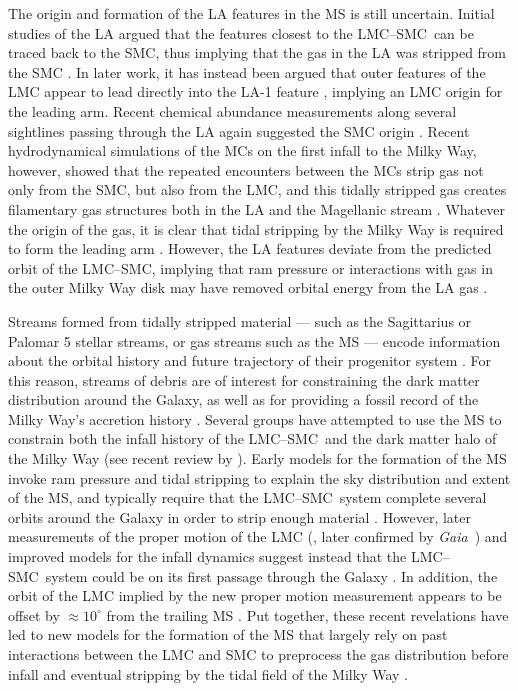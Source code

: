 \documentclass[twocolumn]{aastex62}
\newcommand{\gaia}{\textsl{Gaia}}
\newcommand{\lmcsmc}{LMC--SMC}
\begin{document}
The origin and formation of the LA features in the MS is still uncertain.
Initial studies of the LA argued that the features closest to the \lmcsmc\ can be traced back to the SMC, thus implying that the gas in the LA was stripped from the SMC \citep{Putman:1998}.
In later work, it has instead been argued that outer features of the LMC appear to lead directly into the LA-1 feature \citep{Nidever:2008}, implying an LMC origin for the leading arm.
Recent chemical abundance measurements along several sightlines passing through the LA again suggested the SMC origin \citep{Fox:2018, Richter:2018}.
Recent hydrodynamical simulations of the MCs on the first infall to the Milky Way, however, showed that the repeated encounters between the MCs strip gas not only from the SMC, but also from the LMC, and this tidally stripped gas creates filamentary gas structures both in the LA and the Magellanic stream \citep{Pardy:2018}.
Whatever the origin of the gas, it is clear that tidal stripping by the Milky Way is required to form the leading arm \citep{Nidever:2008, Besla:2012}.
However, the LA features deviate from the predicted orbit of the \lmcsmc, implying that ram pressure or interactions with gas in the outer Milky Way disk may have removed orbital energy from the LA gas \citep[e.g.,][]{Bekki:2008}.

Streams formed from tidally stripped material --- such as the Sagittarius or Palomar 5 \citep{Odenkirchen:2001} stellar streams, or gas streams such as the MS --- encode information about the orbital history and future trajectory of their progenitor system \citep[e.g.,][]{Johnston:1999}.
For this reason, streams of debris are of interest for constraining the dark matter distribution around the Galaxy, as well as for providing a fossil record of the Milky Way's accretion history \citep{Johnston:1998, Bullock:2005}.
Several groups have attempted to use the MS to constrain both the infall history of the \lmcsmc\ and the dark matter halo of the Milky Way (see recent review by \citealt{DOnghia:2016}).
Early models for the formation of the MS invoke ram pressure and tidal stripping to explain the sky distribution and extent of the MS, and typically require that the \lmcsmc\ system complete several orbits around the Galaxy in order to strip enough material \citep[e.g.,][]{Murai:1980, Gardiner:1994, Mastropietro:2005}.
However, later measurements of the proper motion of the LMC (\citealt{Kallivayalil:2006}, later confirmed by \gaia\ \citealt{van-der-Marel:2016}) and improved models for the infall dynamics \citep{Besla:2007} suggest instead that the \lmcsmc\ system could be on its first passage through the Galaxy \citep{Besla:2010, Besla:2012}.
In addition, the orbit of the LMC implied by the new proper motion measurement appears to be offset by $\approx 10^\circ$ from the trailing MS \citep{Besla:2010}.
Put together, these recent revelations have led to new models for the formation of the MS that largely rely on past interactions between the LMC and SMC to preprocess the gas distribution before infall and eventual stripping by the tidal field of the Milky Way \citep{Besla:2012, Diaz:2012}.
\end{document}
